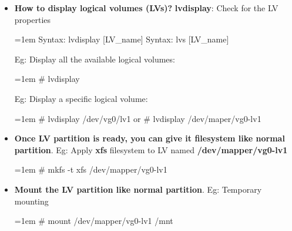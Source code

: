 \begin{flushleft}
\begin{itemize}
	\end{itemize}
	

	\bigskip
	\begin{itemize}
	
	\item 	\textbf{How to display logical volumes (LVs)?}
	\newline
	\textbf{lvdisplay}: Check for the LV properties
	\begin{tcolorbox}[breakable,notitle,boxrule=-0pt,colback=pink,colframe=pink]
		\color{black}
		\font=1em
		Syntax: lvdisplay [LV\_name]
		\newline
		Syntax: lvs [LV\_name]
		\font=4pt
	\end{tcolorbox}
	
	Eg: Display all the available logical volumes:
	\begin{tcolorbox}[breakable,notitle,boxrule=-0pt,colback=black,colframe=black]
		\color{green}
		\font=1em
		\# lvdisplay
		\font=4pt
	\end{tcolorbox}
	Eg: Display a specific logical volume:
	\begin{tcolorbox}[breakable,notitle,boxrule=-0pt,colback=black,colframe=black]
		\color{green}
		\font=1em
		\# lvdisplay /dev/vg0/lv1
		\newline
		or
		\newline
		\# lvdisplay /dev/maper/vg0-lv1
		\font=4pt
	\end{tcolorbox}
	
	\bigskip
	\bigskip	
	
	\item \textbf{Once LV partition is ready, you can give it filesystem like normal partition}.
	\newline
	Eg: Apply \textbf{xfs} filesystem to LV named \textbf{/dev/mapper/vg0-lv1}
	\begin{tcolorbox}[breakable,notitle,boxrule=-0pt,colback=black,colframe=black]
	\color{green}
	\font=1em
	\# mkfs -t xfs /dev/mapper/vg0-lv1
	\font=4pt
	\end{tcolorbox}
	
	\bigskip
	\bigskip
	
	\item \textbf{Mount the LV partition like normal partition}.
	\newline
	Eg: Temporary mounting
	\begin{tcolorbox}[breakable,notitle,boxrule=-0pt,colback=black,colframe=black]
		\color{green}
		\font=1em
		\# mount /dev/mapper/vg0-lv1 /mnt
		\font=4pt
	\end{tcolorbox}


\end{itemize}
\end{flushleft}
